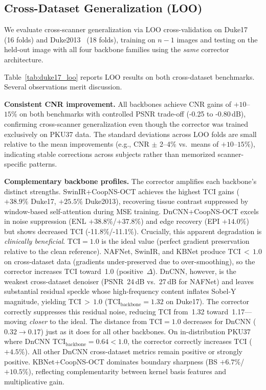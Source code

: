 \documentclass[journal,twoside,web]{ieeecolor}
\begin{document}
\subsection{Cross-Dataset Generalization (LOO)}
\label{sec:results_ood}

We evaluate cross-scanner generalization via LOO cross-validation on Duke17~\cite{fang2012sparsity} (16 folds) and Duke2013~\cite{fang2013fast} (18 folds), training on $n{-}1$ images and testing on the held-out image with all four backbone families using the \emph{same} corrector architecture.

Table~\ref{tab:duke17_loo} reports LOO results on both cross-dataset benchmarks. Several observations merit discussion.

\textbf{Consistent CNR improvement.} All backbones achieve CNR gains of $+10$--$15\%$ on both benchmarks with controlled PSNR trade-off (-0.25 to -0.80\,dB), confirming cross-scanner generalization even though the corrector was trained exclusively on PKU37 data. The standard deviations across LOO folds are small relative to the mean improvements (e.g., CNR $\pm$ 2--4\% vs.\ means of $+10$--$15\%$), indicating stable corrections across subjects rather than memorized scanner-specific patterns.

\textbf{Complementary backbone profiles.} The corrector amplifies each backbone's distinct strengths. SwinIR+CoopNS-OCT achieves the highest TCI gains ($+38.9\%$ Duke17, $+25.5\%$ Duke2013), recovering tissue contrast suppressed by window-based self-attention during MSE training. DnCNN+CoopNS-OCT excels in noise suppression (ENL $+38.8\%$/$+37.8\%$) and edge recovery (EPI $+14.0\%$) but shows decreased TCI (-11.8\%/-11.1\%). Crucially, this apparent degradation is \emph{clinically beneficial}. TCI${}=1.0$ is the ideal value (perfect gradient preservation relative to the clean reference). NAFNet, SwinIR, and KBNet produce TCI$\,{<}\,1.0$ on cross-dataset data (gradients under-preserved due to over-smoothing), so the corrector increases TCI toward~1.0 (positive~$\Delta$). DnCNN, however, is the weakest cross-dataset denoiser (PSNR~24\,dB vs.\ 27\,dB for NAFNet) and leaves substantial residual speckle whose high-frequency content inflates Sobel-Y magnitude, yielding TCI$\,{>}\,1.0$ ($\text{TCI}_\text{backbone} = 1.32$ on Duke17). The corrector correctly suppresses this residual noise, reducing TCI from~1.32 toward~1.17---moving \emph{closer} to the ideal. The distance from TCI${}=1.0$ decreases for DnCNN ($0.32 \to 0.17$) just as it does for all other backbones. On in-distribution PKU37 where DnCNN TCI$_\text{backbone} = 0.64 < 1.0$, the corrector correctly increases TCI ($+4.5\%$). All other DnCNN cross-dataset metrics remain positive or strongly positive. KBNet+CoopNS-OCT dominates boundary sharpness (BS $+6.7\%$/$+10.5\%$), reflecting complementarity between kernel basis features and multiplicative gain.
\end{document}
